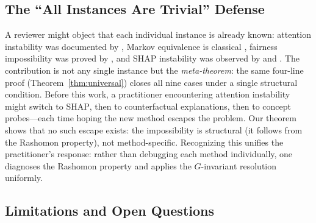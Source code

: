 \documentclass[twoside]{jmlr}
\newcommand{\SHAP}{\textsc{SHAP}}
\begin{document}
\subsection{The ``All Instances Are Trivial'' Defense}
\label{sec:trivial}

A reviewer might object that each individual instance is already known: attention
instability was documented by \citet{jainwallace2019}, Markov equivalence is
classical \citep{verma1991equivalence}, fairness impossibility was proved by
\citet{chouldechova2017fair}, and \SHAP{} instability was observed by
\citet{damour2022underspecification} and \citet{krishna2022disagreement}.  The
contribution is not any single instance but the \emph{meta-theorem}: the same
four-line proof (Theorem~\ref{thm:universal}) closes all nine cases under a
single structural condition.  Before this work, a practitioner encountering
attention instability might switch to \SHAP{}, then to counterfactual
explanations, then to concept probes---each time hoping the new method escapes
the problem.  Our theorem shows that no such escape exists: the impossibility
is structural (it follows from the Rashomon property), not method-specific.
Recognizing this unifies the practitioner's response: rather than debugging each
method individually, one diagnoses the Rashomon property and applies the
$G$-invariant resolution uniformly.

\subsection{Limitations and Open Questions}
\label{sec:limitations}
\end{document}
